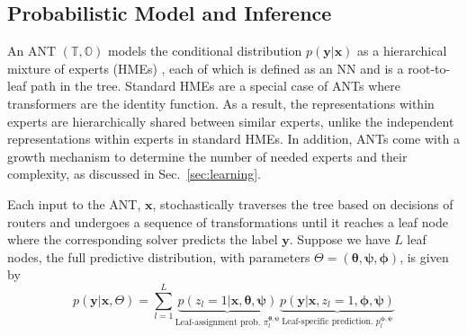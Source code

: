 \subsection{Probabilistic Model and Inference}\label{sec:probmodel}
An ANT $(\mathbb{T}, \mathbb{O})$ models the conditional distribution $p(\mathbf{y}|\mathbf{x})$ as a hierarchical mixture of experts (HMEs) \cite{jordan1994hierarchical}, each of which is defined as an NN and is a root-to-leaf path in the tree. Standard HMEs are a special case of ANTs where transformers are the identity function. As a result, the representations within experts are hierarchically shared between similar experts, unlike the independent representations within experts in standard HMEs. In addition, ANTs come with a growth mechanism to determine the number of needed experts and their complexity, as discussed in Sec.~\ref{sec:learning}. 



Each input to the ANT, $\mathbf{x}$, stochastically traverses the tree based on decisions of routers and undergoes a sequence of transformations until it reaches a leaf node where the corresponding solver predicts the label $\mathbf{y}$. Suppose we have $L$ leaf nodes, the full predictive distribution, with parameters $\Theta = (\boldsymbol{\theta}, \boldsymbol{\psi}, \boldsymbol{\phi})$, is given by
\begin{equation}
p(\mathbf{y}|\mathbf{x}, \Theta)
= \sum_{l=1}^{L} 
\underbrace{p(z_l=1|\mathbf{x}, \boldsymbol{\theta}, \boldsymbol{\psi})}_{\text{Leaf-assignment prob. } \pi_{l}^{\boldsymbol{\theta}, \boldsymbol{\psi}}}
\underbrace{p(\mathbf{y}|\mathbf{x}, z_{l}=1,\boldsymbol{\phi}, \boldsymbol{\psi})}_{\text{Leaf-specific prediction. } p_{l}^{\boldsymbol{\phi}, \boldsymbol{\psi}} } \label{eq:2}
\end{equation}


